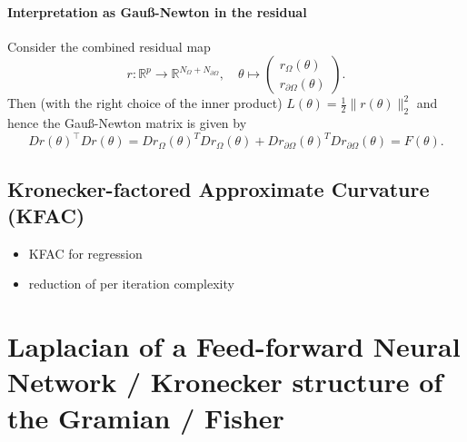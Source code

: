 \documentclass[11pt]{article}
\theoremstyle{definition}
\theoremstyle{plain}
\begin{document}
\paragraph{Interpretation as Gau\ss-Newton in the residual}
Consider the combined residual map 
\begin{equation*}
    r\colon\mathbb R^p\to\mathbb R^{N_\Omega+N_{\partial\Omega}}, \quad \theta \mapsto \begin{pmatrix}
        r_\Omega(\theta) \\ r_{\partial\Omega}(\theta)
    \end{pmatrix}.
\end{equation*}
Then (with the right choice of the inner product) $L(\theta) = \frac12 \lVert r(\theta) \rVert_2^2$ and hence the Gau\ss-Newton matrix is given by 
\[ Dr(\theta)^\top Dr(\theta) = Dr_\Omega(\theta)^T Dr_\Omega(\theta) + Dr_{\partial\Omega}(\theta)^T Dr_{\partial\Omega}(\theta) = F(\theta). \]

\subsection{Kronecker-factored Approximate Curvature (KFAC)}

\begin{itemize}
    \item KFAC for regression 
    \item reduction of per iteration complexity 
\end{itemize}

\section{Laplacian of a Feed-forward Neural Network / 
Kronecker structure of the Gramian / Fisher}

\end{document}
